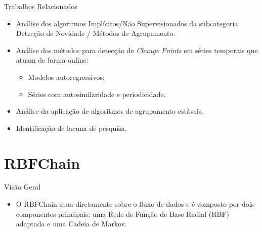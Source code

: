 \documentclass[10pt]{beamer}
\begin{document}
\begin{frame}{Trabalhos Relacionados}
    \begin{itemize}
        \item<1 -> Análise dos algoritmos \alert{Implícitos/Não Supervisionados} da subcategoria \alert{Detecção de Novidade / Métodos de Agrupamento}.
        \item<1 -> Análise dos métodos para detecção de \textit{Change Points} em séries temporais que atuam de forma online:
        \begin{itemize}
            \item<1 -> Modelos autoregressivos;
            \item<1 -> Séries com autosimilaridade e periodicidade.
        \end{itemize}
        \item<1 -> Análise da aplicação de algoritmos de agrupamento estáveis.
        \item<1 -> Identificação de lacuna de pesquisa.
      \end{itemize}
\end{frame}

\section{RBFChain}

\begin{frame}{Visão Geral}
    \begin{itemize}
        \item<1 -> O RBFChain atua diretamente sobre o fluxo de dados e é composto por dois componentes principais: uma Rede de Função de Base Radial (RBF) adaptada e uma Cadeia de Markov.
      \end{itemize}
\end{frame}
\end{document}
